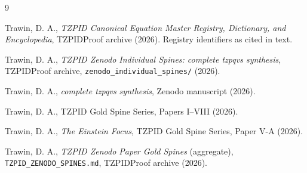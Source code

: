 \documentclass[11pt]{article}
\theoremstyle{remark}
\begin{document}
\begin{thebibliography}{9}

 Trawin, D. A., \emph{TZPID Canonical Equation Master Registry, Dictionary, and Encyclopedia}, TZPIDProof archive (2026). Registry identifiers as cited in text.

 Trawin, D. A., \emph{TZPID Zenodo Individual Spines: complete tzpqvs synthesis}, TZPIDProof archive, \texttt{zenodo\_individual\_spines/} (2026).

 Trawin, D. A., \emph{complete tzpqvs synthesis}, Zenodo manuscript (2026).

 Trawin, D. A., TZPID Gold Spine Series, Papers I--VIII (2026).

 Trawin, D. A., \emph{The Einstein Focus}, TZPID Gold Spine Series, Paper V-A (2026).

 Trawin, D. A., \emph{TZPID Zenodo Paper Gold Spines} (aggregate), \texttt{TZPID\_ZENODO\_SPINES.md}, TZPIDProof archive (2026).

\end{thebibliography}
\end{document}
